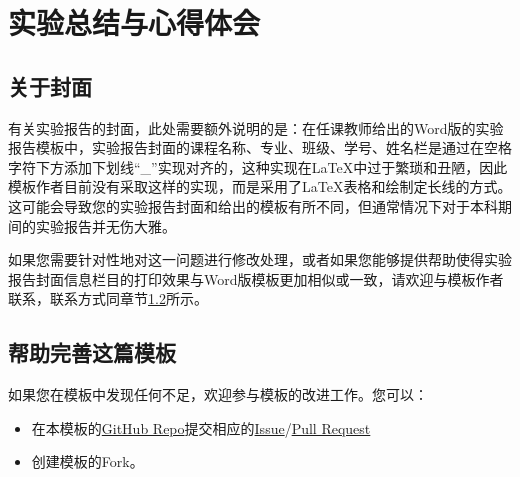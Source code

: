 \chapter{实验总结与心得体会}

\section{关于封面}

有关实验报告的封面，此处需要额外说明的是：在任课教师给出的Word版的实验报告模板中，实验报告封面的课程名称、专业、班级、学号、姓名栏是通过在空格字符下方添加下划线“\_”实现对齐的，这种实现在\LaTeX 中过于繁琐和丑陋，因此模板作者目前没有采取这样的实现，而是采用了\LaTeX 表格和绘制定长线的方式。这可能会导致您的实验报告封面和给出的模板有所不同，但通常情况下对于本科期间的实验报告并无伤大雅。

如果您需要针对性地对这一问题进行修改处理，或者如果您能够提供帮助使得实验报告封面信息栏目的打印效果与Word版模板更加相似或一致，请欢迎与模板作者联系，联系方式同章节\ref{sec:joinus}所示。

\section{帮助完善这篇模板}\label{sec:joinus}

如果您在模板中发现任何不足，欢迎参与模板的改进工作。您可以：

\begin{itemize}
    \item 在本模板的\href{https://github.com/GitHubonline1396529/dlmuucexpreport}{GitHub Repo}提交相应的\href{https://github.com/GitHubonline1396529/dlmuucexpreport/issues}{Issue}/\href{https://github.com/GitHubonline1396529/dlmuucexpreport/pulls}{Pull Request}
    \item 创建模板的Fork。
\end{itemize}
